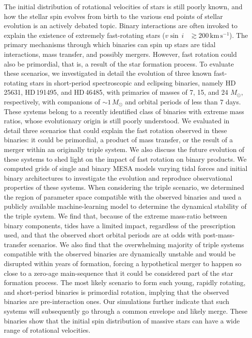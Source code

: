 \documentclass{aa}
\newcommand{\kms}{$\mathrm{km\,s^{-1}}$}
\newcommand{\vsini} {$v\sin\,i$}
\begin{document}
\abstract
{The initial distribution of rotational velocities of stars is still
  poorly known, and how the stellar spin evolves from birth to the
  various end points of stellar evolution is an actively debated
  topic. Binary interactions are often invoked to explain the
  existence of extremely fast-rotating stars (\vsini~
  $\gtrsim 200$\,\kms). The primary mechanisms through which binaries
  can spin up stars are tidal interactions, mass transfer, and
  possibly mergers. However, fast rotation could also be primordial,
  that is, a result of the star formation process.
  To evaluate these scenarios, we investigated in detail the
  evolution of three known fast-rotating stars in short-period spectroscopic and eclipsing
  binaries, namely HD\,25631, HD\,191495, and HD\,46485, with
  primaries of masses of 7, 15, and 24 $M_{\odot}$, respectively, with
  companions of $\sim1\,M_\odot$ and orbital periods of less than 7 days. These systems belong to a
  recently identified class of binaries with extreme mass ratios, whose evolutionary origin is still poorly understood.}
{We evaluated in detail three scenarios that could explain the fast
    rotation observed in these binaries: it could be primordial, a
    product of mass transfer, or the result of a merger within an
    originally triple system. We also discuss the future evolution of
    these systems to shed light on the impact of fast rotation on
    binary products.}
  {We computed grids of single and binary MESA models varying tidal
      forces and initial binary architectures to investigate the
      evolution and reproduce observational properties of these
      systems. When considering the triple scenario, we determined the
      region of parameter space compatible with the observed binaries
      and used a publicly available machine-learning model to determine
      the dynamical stability of the triple system.}
{We find that, because of the extreme mass-ratio between binary components,
     tides have a limited impact, regardless of the prescription used, and that
    the observed short orbital periods are at odds with post-mass-transfer
    scenarios.
   We also find that the overwhelming majority of triple systems compatible with the observed binaries are dynamically unstable and would be disrupted within years of formation, forcing a hypothetical merger to happen so close to a zero-age main-sequence that it could be considered part of the star formation process.}
 {The most likely scenario to form such young, rapidly rotating,
    and short-period binaries is primordial rotation, implying that the
    observed binaries are pre-interaction ones. Our simulations further indicate
  that such systems will subsequently go through a common envelope and
  likely merge. These binaries show that the initial spin distribution of massive
  stars can have a wide range of rotational velocities.}
{}
\end{document}
